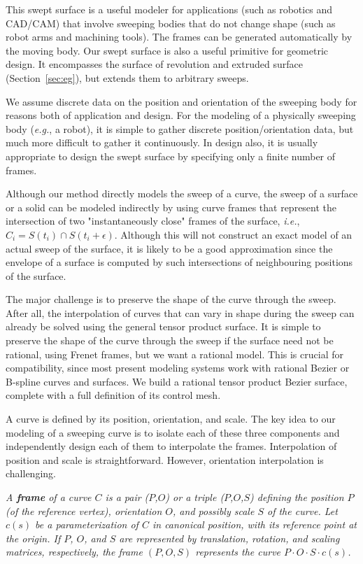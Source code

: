 This swept surface is a useful modeler for applications (such as
robotics and CAD/CAM) that involve sweeping bodies that do not change shape 
(such as robot arms and machining tools).
The frames can be generated automatically by the moving body.
Our swept surface is also a useful primitive for geometric design.
It encompasses the surface of revolution and extruded surface
(Section~\ref{sec:eg}), but extends them to arbitrary sweeps.

We assume discrete data on the position and orientation
of the sweeping body for reasons both of application and design.
For the modeling of a physically sweeping body ({\em e.g.}, a robot), 
it is simple to gather discrete position/orientation data, 
but much more difficult to gather it continuously.
In design also, it is usually appropriate to design the swept surface
by specifying only a finite number of frames.

Although our method directly models the sweep of a curve,
the sweep of a surface or a solid can be modeled indirectly
by using curve frames that represent the intersection of two 
"instantaneously close" frames of the surface,
{\em i.e.}, $C_i = S(t_i) \cap S(t_i+\epsilon)$.
Although this will not construct an 
exact model of an actual sweep of the surface,
it is likely to be a good approximation since the 
envelope of a surface is computed by such intersections
of neighbouring positions of the surface.

The major challenge is to preserve the shape of the curve through the sweep.
After all, the interpolation of curves that can vary in shape during the sweep
can already be solved using the general tensor product surface.
It is simple to preserve the shape of the curve through the sweep
if the surface need not be rational, using Frenet frames,
but we want a rational model.
This is crucial for compatibility, 
since most present modeling systems work with rational Bezier or
B-spline curves and surfaces.
We build a rational tensor product Bezier surface, complete with a full
definition of its control mesh.

A curve is defined by its position, orientation, and scale.
The key idea to our modeling of a sweeping curve is to isolate each
of these three components and independently design each of them 
to interpolate the frames.
Interpolation of position and scale is straightforward.
However, orientation interpolation is challenging.

\begin{defn2}
{\em
A {\bf frame} of a curve $C$ is a pair ($P$,$O$) or a triple 
($P$,$O$,$S$)
defining the position $P$ (of the reference vertex), 
orientation $O$, and possibly scale $S$ of the curve.
Let $c(s)$ be a parameterization of $C$ in canonical position,
with its reference point at the origin.
If $P$, $O$, and $S$ are represented by translation, rotation, and scaling 
matrices, respectively, the frame $(P,O,S)$ represents the curve 
$P \cdot O \cdot S \cdot c(s)$.
}
\end{defn2}

